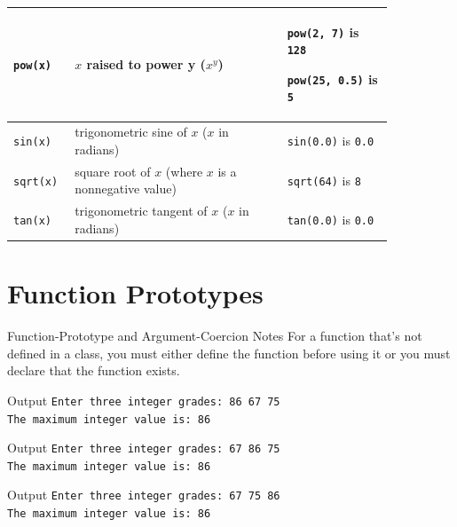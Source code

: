 \documentclass[10pt]{beamer}
\begin{document}
\begin{frame}
\begin{tabular}{p{0.1\linewidth} p{0.5\linewidth} p{0.25\linewidth}}
		
		\rowcolor{lightcyan} \texttt{pow(x)} & $x$ raised to power y ($x^y$) & 
		\texttt{pow(2, 7)} is \texttt{128}
		
		\texttt{pow(25, 0.5)} is \texttt{5} \\\hline
		
		
		\rowcolor{lightcyan} \texttt{sin(x)} & trigonometric sine of $x$ ($x$ in radians) & \texttt{sin(0.0)} is \texttt{0.0} \\\hline
		
		
		\rowcolor{lightcyan} \texttt{sqrt(x)} & square root of $x$ (where $x$ is a nonnegative value) & \texttt{sqrt(64)} is \texttt{8} \\\hline
		
		
		\rowcolor{lightcyan} \texttt{tan(x)} & trigonometric tangent of $x$	($x$ in radians) & \texttt{tan(0.0)} is \texttt{0.0} \\\hline

	\end{tabular}
\end{frame}


\section{Function Prototypes}
\begin{frame}{Function-Prototype and Argument-Coercion Notes}
	\justifying
	For a function that’s not defined in a class, you must either define the function before
	using it or you must declare that the function exists.
	
\end{frame}


\begin{frame}
	
\end{frame}


\begin{frame}
	\begin{block}{\color{white}Output}
		\texttt{Enter three integer grades: 86 67 75\\
			The maximum integer value is: 86}
	\end{block}
	\begin{block}{\color{white}Output}
		\texttt{Enter three integer grades: 67 86 75\\
			The maximum integer value is: 86}
	\end{block}
	\begin{block}{\color{white}Output}
		\texttt{Enter three integer grades: 67 75 86\\
			The maximum integer value is: 86}
	\end{block}
\end{frame}
\end{document}

